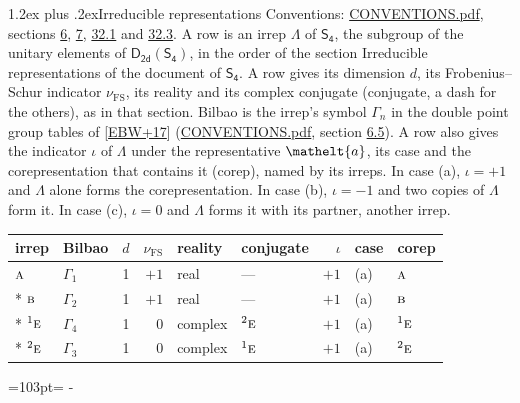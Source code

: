 \documentclass[10pt,a4paper]{article}
\makeatletter
\renewcommand\section{\@startsection{section}{1}{\z@}{-3ex plus -1ex minus -.2ex}%
  {1.2ex plus .2ex}{\normalfont\large\sffamily\bfseries\color{parttitle}}}
\newcommand{\needspace}[1]{\par\penalty-100\begingroup\dimen0=#1\relax\dimen2=\pagegoal
  \advance\dimen2-\pagetotal\ifdim\dimen0>\dimen2\relax\ifdim\dimen2>0pt\vfil\break\fi\fi
  \endgroup}
\numberwithin{equation}{section}
\newcommand{\eltfont}[1]{{\let\sigma\eltsigma\mathelt{#1}}}
\newcommand{\grp}[1]{\mathsf{#1}}
\newcommand{\irr}[1]{\text{\normalfont\scshape #1}}
\newcommand{\conjpair}[1]{{}^{#1}}
\newcommand{\elt}[1]{\eltfont{#1}}
\newcommand{\fsind}{\nu_{\mathrm{FS}}}
\makeatother
\begin{document}
\section{Irreducible representations}\label{s:irreps}
Conventions: \href{../../CONVENTIONS.pdf}{CONVENTIONS.pdf}, sections \href{../../../rotation/CONVENTIONS.pdf\#conv.6}{6}, \href{../../../rotation/CONVENTIONS.pdf\#conv.7}{7}, \href{../../CONVENTIONS.pdf\#conv.32.1}{32.1} and \href{../../CONVENTIONS.pdf\#conv.32.3}{32.3}.
\leavevmode\label{n:irrep.Delta}A row is an irrep $\Lambda$ of $\grp{S_{4}}$, the subgroup of the unitary elements of $\grp{D_{2d}}(\grp{S_{4}})$, in the order of the section Irreducible representations of the document of \href{../../../rotation/data/pdf/S4.pdf}{$\grp{S_{4}}$}. \label{n:index.dimension}\label{n:index.frobenius}\label{n:head.irrep}\label{n:head.reality}\label{n:head.conjugate}A row gives its dimension $d$, its Frobenius--Schur indicator $\fsind$, its reality and its complex conjugate (conjugate, a dash for the others), as in that section. \label{n:head.bilbao}\label{n:irrep.alias.gamma}Bilbao is the irrep's symbol $\Gamma_n$ in the double point group tables of [\href{../../../REFERENCES.pdf\#ref.EBW+17}{EBW+17}] (\href{../../CONVENTIONS.pdf}{CONVENTIONS.pdf}, section \href{../../../rotation/CONVENTIONS.pdf\#conv.6.5}{6.5}). \label{n:head.case.corep}\label{n:head.corep}A row also gives the indicator $\iota$ of $\Lambda$ under the representative $\elt{a}$, its case and the corepresentation that contains it (corep), named by its irreps. In case (a), $\iota = +1$ and $\Lambda$ alone forms the corepresentation. In case (b), $\iota = -1$ and two copies of $\Lambda$ form it. In case (c), $\iota = 0$ and $\Lambda$ forms it with its partner, another irrep.
\setlength{\emergencystretch}{2em}\par\setlength{\emergencystretch}{0pt}
{\small\renewcommand{\arraystretch}{1.25}\setlength{\tabcolsep}{4pt}\begin{longtable}{@{}llrrllrll@{}}\toprule
irrep & Bilbao & $d$ & $\fsind$ & reality & conjugate & $\iota$ & case & corep\\\midrule\endhead
\bottomrule\endfoot\endlastfoot
$\irr{a}$ & $\Gamma_{1}$ & 1 & $+1$ & real & --- & $+1$ & (a) & $\irr{a}$\\*
$\irr{b}$ & $\Gamma_{2}$ & 1 & $+1$ & real & --- & $+1$ & (a) & $\irr{b}$\\*
$\conjpair{1}\irr{e}$ & $\Gamma_{4}$ & 1 & $0$ & complex & $\conjpair{2}\irr{e}$ & $+1$ & (a) & $\conjpair{1}\irr{e}$\\*
$\conjpair{2}\irr{e}$ & $\Gamma_{3}$ & 1 & $0$ & complex & $\conjpair{1}\irr{e}$ & $+1$ & (a) & $\conjpair{2}\irr{e}$\\
\bottomrule\end{longtable}}
\needspace{103pt}
\end{document}
